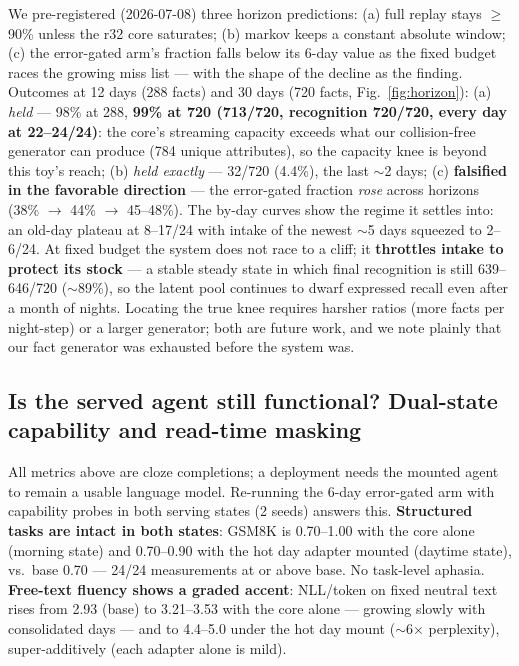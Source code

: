 \documentclass[11pt]{article}
\begin{document}
We pre-registered (2026-07-08) three horizon predictions: (a) full replay stays $\ge$90\% unless the
r32 core saturates; (b) markov keeps a constant absolute window; (c) the error-gated arm's fraction
falls below its 6-day value as the fixed budget races the growing miss list --- with the shape of the
decline as the finding. Outcomes at 12 days (288 facts) and 30 days (720 facts,
Fig.~\ref{fig:horizon}): (a) \emph{held} --- 98\% at 288, \textbf{99\% at 720 (713/720, recognition
720/720, every day at 22--24/24)}: the core's streaming capacity exceeds what our collision-free
generator can produce (784 unique attributes), so the capacity knee is beyond this toy's reach;
(b) \emph{held exactly} --- 32/720 (4.4\%), the last $\sim$2 days; (c) \textbf{falsified in the
favorable direction} --- the error-gated fraction \emph{rose} across horizons (38\% $\to$ 44\% $\to$
45--48\%). The by-day curves show the regime it settles into: an old-day plateau at 8--17/24 with
intake of the newest $\sim$5 days squeezed to 2--6/24. At fixed budget the system does not race to a
cliff; it \textbf{throttles intake to protect its stock} --- a stable steady state in which final
recognition is still 639--646/720 ($\sim$89\%), so the latent pool continues to dwarf expressed
recall even after a month of nights. Locating the true knee requires harsher ratios (more facts per
night-step) or a larger generator; both are future work, and we note plainly that our fact generator
was exhausted before the system was.

\subsection{Is the served agent still functional? Dual-state capability and read-time masking}
\label{sec:capability}

All metrics above are cloze completions; a deployment needs the mounted agent to remain a usable
language model. Re-running the 6-day error-gated arm with capability probes in both serving states
(2 seeds) answers this. \textbf{Structured tasks are intact in both states}: GSM8K is 0.70--1.00
with the core alone (morning state) and 0.70--0.90 with the hot day adapter mounted (daytime state),
vs.\ base 0.70 --- 24/24 measurements at or above base. No task-level aphasia. \textbf{Free-text
fluency shows a graded accent}: NLL/token on fixed neutral text rises from 2.93 (base) to 3.21--3.53
with the core alone --- growing slowly with consolidated days --- and to 4.4--5.0 under the hot day
mount ($\sim$6$\times$ perplexity), super-additively (each adapter alone is mild).
\end{document}
